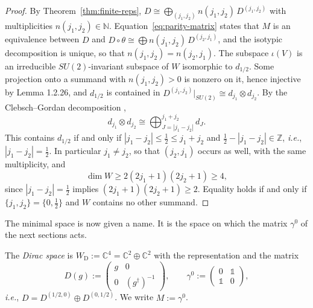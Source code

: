 \begin{proof}
	By Theorem~\ref{thm:finite-reps}, $D\cong\bigoplus_{(j_1,j_2)}n(j_1,j_2)\,D^{(j_1,j_2)}$ with multiplicities $n(j_1,j_2)\in\mathbb{N}$. Equation~\eqref{eq:parity-matrix} states that $M$ is an equivalence between $D$ and $D\circ\theta\cong\bigoplus n(j_1,j_2)\,D^{(j_2,j_1)}$, and the isotypic decomposition is unique, so that $n(j_1,j_2)=n(j_2,j_1)$. The subspace $\iota(V)$ is an irreducible $SU(2)$-invariant subspace of $W$ isomorphic to $d_{1/2}$. Some projection onto a summand with $n(j_1,j_2)>0$ is nonzero on it, hence injective by Lemma 1.2.26, and $d_{1/2}$ is contained in $D^{(j_1,j_2)}|_{SU(2)}\cong d_{j_1}\otimes d_{j_2}$. By the Clebsch--Gordan decomposition \cite[TODO-location]{TODO-Hal03},
	\begin{equation*}
		d_{j_1}\otimes d_{j_2}\cong\bigoplus_{J=|j_1-j_2|}^{j_1+j_2}d_J.
	\end{equation*}
	This contains $d_{1/2}$ if and only if $|j_1-j_2|\leq\tfrac12\leq j_1+j_2$ and $\tfrac12-|j_1-j_2|\in\mathbb{Z}$, \textit{i.e.}, $|j_1-j_2|=\tfrac12$. In particular $j_1\neq j_2$, so that $(j_2,j_1)$ occurs as well, with the same multiplicity, and
	\begin{equation*}
		\dim W\geq2(2j_1+1)(2j_2+1)\geq4,
	\end{equation*}
	since $|j_1-j_2|=\tfrac12$ implies $(2j_1+1)(2j_2+1)\geq2$. Equality holds if and only if $\{j_1,j_2\}=\{0,\tfrac12\}$ and $W$ contains no other summand.
\end{proof}

\noindent The minimal space is now given a name. It is the space on which the matrix $\gamma^0$ of the next sections acts.

\begin{definition}\label{def:dirac-space}
	The \emph{Dirac space} is $W_{\mathrm{D}}:=\mathbb{C}^4=\mathbb{C}^2\oplus\mathbb{C}^2$ with the representation and the matrix
	\begin{equation*}
		D(g):=\begin{pmatrix}g&0\\0&(g^\dagger)^{-1}\end{pmatrix},\qquad\gamma^0:=\begin{pmatrix}0&\mathbb{1}\\\mathbb{1}&0\end{pmatrix},
	\end{equation*}
	\textit{i.e.}, $D=D^{(1/2,0)}\oplus D^{(0,1/2)}$. We write $M:=\gamma^0$.
\end{definition}


